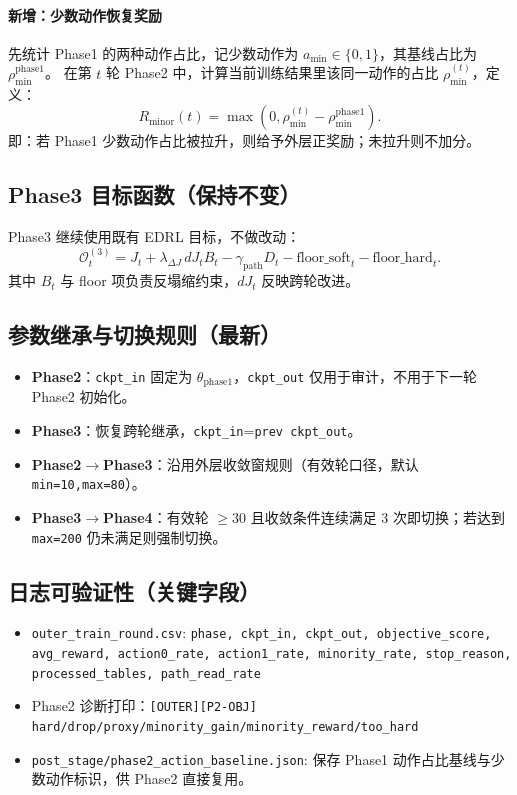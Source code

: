 \documentclass[UTF8,11pt,a4paper]{ctexart}
\begin{document}
\paragraph{新增：少数动作恢复奖励}
先统计 Phase1 的两种动作占比，记少数动作为 \(a_{\min}\in\{0,1\}\)，其基线占比为
\(
\rho^{\mathrm{phase1}}_{\min}
\)。
在第 \(t\) 轮 Phase2 中，计算当前训练结果里该同一动作的占比
\(
\rho^{(t)}_{\min}
\)，定义：
\begin{equation}
R_{\mathrm{minor}}(t)=\max\!\left(0,\rho^{(t)}_{\min}-\rho^{\mathrm{phase1}}_{\min}\right).
\end{equation}
即：若 Phase1 少数动作占比被拉升，则给予外层正奖励；未拉升则不加分。

\subsection{Phase3 目标函数（保持不变）}
Phase3 继续使用既有 EDRL 目标，不做改动：
\begin{equation}
\mathcal{O}^{(3)}_t
=
J_t+\lambda_{\Delta J}\,dJ_t
B_t
-\gamma_{\mathrm{path}}D_t
-\text{floor\_soft}_t
-\text{floor\_hard}_t.
\end{equation}
其中 \(B_t\) 与 floor 项负责反塌缩约束，\(dJ_t\) 反映跨轮改进。

\subsection{参数继承与切换规则（最新）}
\begin{itemize}
\item \textbf{Phase2}：\texttt{ckpt\_in} 固定为 \(\theta_{\mathrm{phase1}}\)，\texttt{ckpt\_out} 仅用于审计，不用于下一轮 Phase2 初始化。
\item \textbf{Phase3}：恢复跨轮继承，\texttt{ckpt\_in}=\texttt{prev ckpt\_out}。
\item \textbf{Phase2\(\rightarrow\)Phase3}：沿用外层收敛窗规则（有效轮口径，默认 \texttt{min=10,max=80}）。
\item \textbf{Phase3\(\rightarrow\)Phase4}：有效轮 \(\ge 30\) 且收敛条件连续满足 3 次即切换；若达到 \texttt{max=200} 仍未满足则强制切换。
\end{itemize}

\subsection{日志可验证性（关键字段）}
\begin{itemize}
\item \texttt{outer\_train\_round.csv}: \texttt{phase, ckpt\_in, ckpt\_out, objective\_score, avg\_reward, action0\_rate, action1\_rate, minority\_rate, stop\_reason, processed\_tables, path\_read\_rate}
\item Phase2 诊断打印：\texttt{[OUTER][P2-OBJ] hard/drop/proxy/minority\_gain/minority\_reward/too\_hard}
\item \texttt{post\_stage/phase2\_action\_baseline.json}: 保存 Phase1 动作占比基线与少数动作标识，供 Phase2 直接复用。
\end{itemize}
\end{document}

